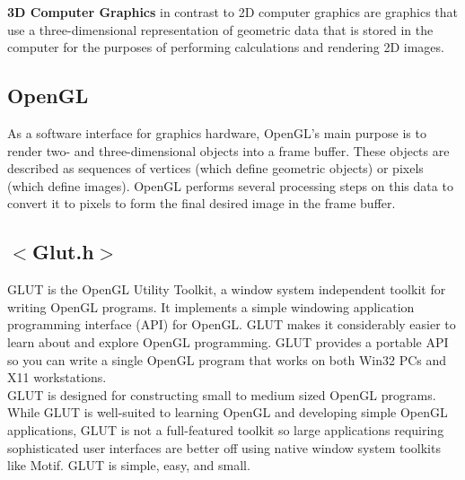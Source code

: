 \documentclass[fontsize=12pt]{article}
\begin{document}
    \textbf{3D Computer Graphics} in contrast to 2D computer graphics are graphics that use a three-dimensional representation of geometric data that is stored in the computer for the purposes of performing calculations and rendering 2D images.\\

\subsection{OpenGL}

As a software interface for graphics hardware, OpenGL's main purpose is to render two- and three-dimensional objects into a frame buffer. These objects are described as sequences of vertices (which define geometric objects) or pixels (which define images). OpenGL\cite{R:3} performs several processing steps on this data to convert it to pixels to form the final desired image in the frame buffer.\\

\subsection{$<$Glut.h$>$}

GLUT is the OpenGL Utility Toolkit, a window system independent toolkit for writing OpenGL programs. It implements a simple windowing application programming interface (API) for OpenGL. GLUT makes it considerably easier to learn about and explore OpenGL programming. GLUT provides a portable API so you can write a single OpenGL program that works on both Win32 PCs and X11 workstations\cite{R:4}.\\

GLUT is designed for constructing small to medium sized OpenGL programs. While GLUT is well-suited to learning OpenGL and developing simple OpenGL applications, GLUT is not a full-featured toolkit so large applications requiring sophisticated user interfaces are better off using native window system toolkits like Motif. GLUT is simple, easy, and small.
\end{document}
